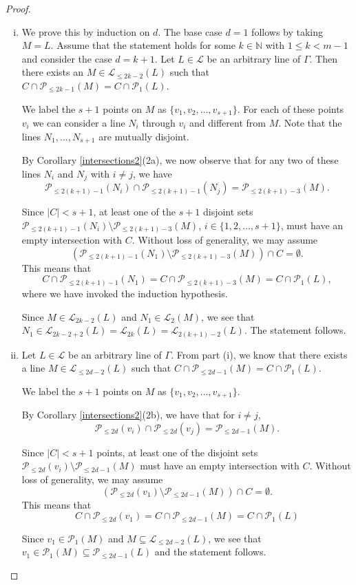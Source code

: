 \documentclass[12pt]{article}
\newcommand{\N}{\mathbb{N}}
\newcommand{\Points}{\mathcal{P}}
\newcommand{\Lines}{\mathcal{L}}
\theoremstyle{remark}
\begin{document}
\begin{proof}
	\(\)
	\begin{enumerate}[(i)]
		\item We prove this by induction on \(d\). The base case \(d=1\) follows by taking $M=L$.
		Assume that the statement holds for some \(k\in \N\) with \(1\le k < m-1\) and consider the case \(d=k+1\). 
		Let \(L\in\Lines\) be an arbitrary line of \(\Gamma\). Then there exists an \(M\in \Lines_{\le 2k-2}(L)\) such that \(C\cap \Points_{\le2k-1}(M) = C\cap \Points_{1}(L)\). 
		
		We label the \(s+1\) points on \(M\) as \(\{v_1,v_2,\dots,v_{s+1}\}\). For each of these points \(v_i\) we can consider a line \(N_i\) through \(v_i\) and different from \(M\). Note that the lines $N_1,\ldots,N_{s+1}$ are mutually disjoint.
		
		By Corollary \ref{intersections2}(2a), we now observe that for any two of these lines \(N_i\) and \(N_j\) with \(i\neq j\), we have \[\Points_{\le 2(k+1)-1}(N_i)\cap \Points_{\le 2(k+1)-1}(N_j)= \Points_{\le 2(k+1)-3}(M).\]
		
		Since  \(|C|<s+1\), at least one of the $s+1$ disjoint sets \(\Points_{\le 2(k+1)-1}(N_i)\setminus \Points_{\le 2(k+1)-3}(M) \), $i \in \{1,2,\ldots,s+1\}$, must have an empty intersection with \(C\). Without loss of generality, we may assume 
		\[(\Points_{\le 2(k+1)-1}(N_1)\setminus \Points_{\le 2(k+1)-3}(M)) \cap C = \emptyset.\]
		This means that 
		\[C\cap \Points_{\le2(k+1)-1}(N_1) = C\cap \Points_{\le2(k+1)-3}(M) = C\cap \Points_{1}(L),\]
		 where we have invoked the induction hypothesis.
         
		Since \(M\in \Lines_{2k-2}(L)\) and \(N_1\in\Lines_{2}(M)\),  we see that \(N_1\in   \Lines_{2k-2+2}(L)=\Lines_{2k}(L)=\Lines_{2(k+1)-2}(L)\). The statement follows.
		
		\item Let \(L\in\Lines\) be an arbitrary line of \(\Gamma\). 
		From part (i), we know that there exists a line \(M\in \Lines_{\le 2d-2}(L)\) such that \(C\cap \Points_{\le2d-1}(M) = C\cap \Points_{1}(L)\).
		
		We label the \(s+1\) points on \(M\) as \(\{v_1,v_2,\dots,v_{s+1}\}\). 

		By Corollary \ref{intersections2}(2b), we have that for \(i\neq j\),  \[\Points_{\le 2d}(v_i)\cap \Points_{\le 2d}(v_j)= \Points_{\le 2d-1}(M).\]
		
		Since \(|C|<s+1\) points, at least one of the disjoint  sets \(\Points_{\le 2d}(v_i)\setminus \Points_{\le 2d-1}(M) \) must have an empty intersection with \(C\). Without loss of generality, we may assume 
		\[(\Points_{\le 2d}(v_1)\setminus \Points_{\le 2d-1}(M)) \cap C = \emptyset.\]
		This means that 
		\[C\cap \Points_{\le2d}(v_1) = C\cap \Points_{\le2d-1}(M) = C\cap \Points_{1}(L)\]
		
		Since $v_1\in \Points_1(M)$ and $M\subseteq \Lines_{\leq 2d-2}(L)$, we see that \(v_1\in \Points_{1}(M) \subseteq \Points_{\leq 2d-1}(L)\) and the statement follows.\qedhere
	\end{enumerate}
\end{proof}
\end{document}
